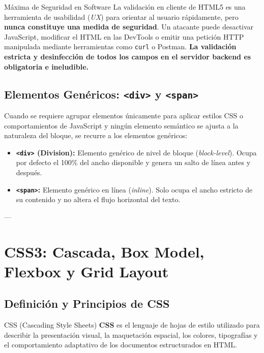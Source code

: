 \begin{enumerate}
    \begin{importante}{Máxima de Seguridad en Software}
    La validación en cliente de HTML5 es una herramienta de usabilidad (\textit{UX}) para orientar al usuario rápidamente, pero \textbf{nunca constituye una medida de seguridad}. Un atacante puede desactivar JavaScript, modificar el HTML en las DevTools o emitir una petición HTTP manipulada mediante herramientas como \texttt{curl} o Postman. \textbf{La validación estricta y desinfección de todos los campos en el servidor backend es obligatoria e ineludible.}
    \end{importante}
\end{enumerate}

\subsection{Elementos Genéricos: \texttt{<div>} y \texttt{<span>}}

Cuando se requiere agrupar elementos únicamente para aplicar estilos CSS o comportamientos de JavaScript y ningún elemento semántico se ajusta a la naturaleza del bloque, se recurre a los elementos genéricos:
\begin{itemize}[leftmargin=1.2cm]
  \item \textbf{\texttt{<div>} (Division):} Elemento genérico de nivel de bloque (\textit{block-level}). Ocupa por defecto el 100\% del ancho disponible y genera un salto de línea antes y después.
  \item \textbf{\texttt{<span>}:} Elemento genérico en línea (\textit{inline}). Solo ocupa el ancho estricto de su contenido y no altera el flujo horizontal del texto.
\end{itemize}

---

\section{CSS3: Cascada, Box Model, Flexbox y Grid Layout}

\subsection{Definición y Principios de CSS}

\begin{definicion}{CSS (Cascading Style Sheets)}
\textbf{CSS} es el lenguaje de hojas de estilo utilizado para describir la presentación visual, la maquetación espacial, los colores, tipografías y el comportamiento adaptativo de los documentos estructurados en HTML.
\end{definicion}

